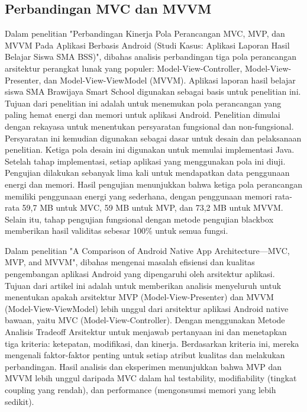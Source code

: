 \documentclass[conference]{IEEEtran}
\begin{document}
\subsection{Perbandingan MVC dan MVVM}
Dalam penelitian "Perbandingan Kinerja Pola Perancangan MVC, MVP, dan MVVM Pada Aplikasi Berbasis Android (Studi Kasus: Aplikasi Laporan Hasil Belajar Siswa SMA BSS)"\cite{Perbandingan1}, dibahas analisis perbandingan tiga pola perancangan arsitektur perangkat lunak yang populer: Model-View-Controller, Model-View-Presenter, dan Model-View-ViewModel (MVVM).  Aplikasi laporan hasil belajar siswa SMA Brawijaya Smart School digunakan sebagai basis untuk penelitian ini. Tujuan dari penelitian ini adalah untuk menemukan pola perancangan yang paling hemat energi dan memori untuk aplikasi Android. Penelitian dimulai dengan rekayasa untuk menentukan persyaratan fungsional dan non-fungsional. Persyaratan ini kemudian digunakan sebagai dasar untuk desain dan pelaksanaan penelitian. Ketiga pola desain ini digunakan untuk memulai implementasi Java. Setelah tahap implementasi, setiap aplikasi yang menggunakan pola ini diuji. Pengujian dilakukan sebanyak lima kali untuk mendapatkan data penggunaan energi dan memori. Hasil pengujian menunjukkan bahwa ketiga pola perancangan memiliki penggunaan energi yang sederhana, dengan penggunaan memori rata-rata 59,7 MB untuk MVC, 59 MB untuk MVP, dan 73,2 MB untuk MVVM. Selain itu, tahap pengujian fungsional dengan metode pengujian blackbox memberikan hasil validitas sebesar 100\% untuk semua fungsi.

Dalam penelitian "A Comparison of Android Native App Architecture—MVC, MVP, and MVVM"\cite{Perbandingan2}, dibahas mengenai masalah efisiensi dan kualitas pengembangan aplikasi Android yang dipengaruhi oleh arsitektur aplikasi. Tujuan dari artikel ini adalah untuk memberikan analisis menyeluruh untuk menentukan apakah arsitektur MVP (Model-View-Presenter) dan MVVM (Model-View-ViewModel) lebih unggul dari arsitektur aplikasi Android native bawaan, yaitu MVC (Model-View-Controller). Dengan menggunakan Metode Analisis Tradeoff Arsitektur untuk menjawab pertanyaan ini dan menetapkan tiga kriteria: ketepatan, modifikasi, dan kinerja. Berdasarkan kriteria ini, mereka mengenali faktor-faktor penting untuk setiap atribut kualitas dan melakukan perbandingan. Hasil analisis dan eksperimen menunjukkan bahwa MVP dan MVVM lebih unggul daripada MVC dalam hal testability, modifiability (tingkat coupling yang rendah), dan performance (mengonsumsi memori yang lebih sedikit).
\end{document}
